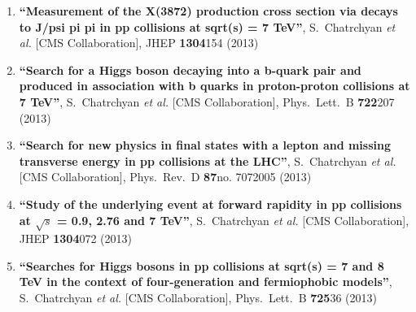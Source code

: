 \begin{enumerate}
\item%
{\bf ``Measurement of the X(3872) production cross section via decays to J/psi pi pi in pp collisions at sqrt(s) = 7 TeV''}, 
  S.~Chatrchyan {\it et al.}  [CMS Collaboration], 
JHEP {\bf 1304}154 (2013) %


\item%
{\bf ``Search for a Higgs boson decaying into a b-quark pair and produced in association with b quarks in proton-proton collisions at 7 TeV''}, 
  S.~Chatrchyan {\it et al.}  [CMS Collaboration], 
Phys.\ Lett.\ B {\bf 722}207 (2013) %


\item%
{\bf ``Search for new physics in final states with a lepton and missing transverse energy in pp collisions at the LHC''}, 
  S.~Chatrchyan {\it et al.}  [CMS Collaboration], 
Phys.\ Rev.\ D {\bf 87}no. 7072005 (2013) %


\item%
{\bf ``Study of the underlying event at forward rapidity in pp collisions at $\sqrt{s}$ = 0.9, 2.76 and 7 TeV''}, 
  S.~Chatrchyan {\it et al.}  [CMS Collaboration], 
JHEP {\bf 1304}072 (2013) %


\item%
{\bf ``Searches for Higgs bosons in pp collisions at sqrt(s) = 7 and 8 TeV in the context of four-generation and fermiophobic models''}, 
  S.~Chatrchyan {\it et al.}  [CMS Collaboration], 
Phys.\ Lett.\ B {\bf 725}36 (2013) %



\end{enumerate}
